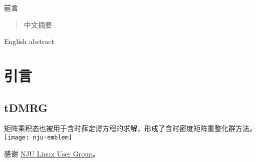\documentclass[
    ]{njuthesis}
\begin{document}

\maketitle


\begin{preface}
    前言
\end{preface}

\begin{abstract}
    中文摘要
\end{abstract}

\begin{abstract*}
    English abstract
\end{abstract*}

\tableofcontents
\listoffigures
\listoftables

\mainmatter

%   
%   

\chapter{引言}

\section{tDMRG}

矩阵乘积态也被用于含时薛定谔方程的求解，形成了含时密度矩阵重整化群方法\cite{schollwock2011}。
\texttt{[image: nju-emblem]}


\printbibliography


\begin{acknowledgement}
    感谢 \href{https://git.nju.edu.cn/nju-lug/lug-introduction}{NJU Linux User Group}。
\end{acknowledgement}
    

\appendix


\end{document}
